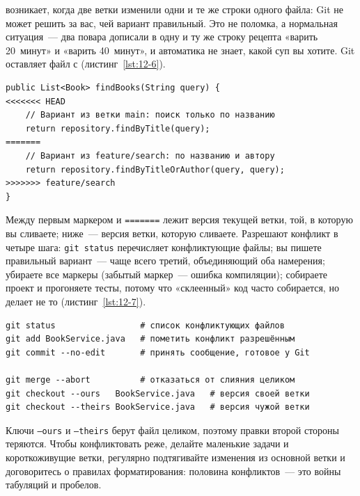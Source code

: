  возникает, когда две ветки изменили одни и те же строки одного файла: Git не может решить за вас, чей вариант правильный. Это не поломка, а нормальная ситуация~--- два повара дописали в одну и ту же строку рецепта «варить 20~минут» и «варить 40~минут», и автоматика не знает, какой суп вы хотите. Git оставляет файл с  (листинг~\ref{lst:12-6}).

\begin{listing}[H]
\begin{verbatim}
public List<Book> findBooks(String query) {
<<<<<<< HEAD
    // Вариант из ветки main: поиск только по названию
    return repository.findByTitle(query);
=======
    // Вариант из feature/search: по названию и автору
    return repository.findByTitleOrAuthor(query, query);
>>>>>>> feature/search
}
\end{verbatim}
\caption{Маркеры конфликта в файле}
\label{lst:12-6}
\end{listing}

Между первым маркером и \texttt{=======} лежит версия текущей ветки, той, в которую вы сливаете; ниже~--- версия ветки, которую сливаете. Разрешают конфликт в четыре шага: \texttt{git status} перечисляет конфликтующие файлы; вы пишете правильный вариант~--- чаще всего третий, объединяющий оба намерения; убираете все маркеры (забытый маркер~--- ошибка компиляции); собираете проект и прогоняете тесты, потому что «склеенный» код часто собирается, но делает не то (листинг~\ref{lst:12-7}).

\begin{listing}[H]
\begin{verbatim}
git status                 # список конфликтующих файлов
git add BookService.java   # пометить конфликт разрешённым
git commit --no-edit       # принять сообщение, готовое у Git

git merge --abort          # отказаться от слияния целиком
git checkout --ours   BookService.java   # версия своей ветки
git checkout --theirs BookService.java   # версия чужой ветки
\end{verbatim}
\caption{Команды при разрешении конфликта}
\label{lst:12-7}
\end{listing}

Ключи \texttt{--ours} и \texttt{--theirs} берут файл целиком, поэтому правки второй стороны теряются. Чтобы конфликтовать реже, делайте маленькие задачи и короткоживущие ветки, регулярно подтягивайте изменения из основной ветки и договоритесь о правилах форматирования: половина конфликтов~--- это войны табуляций и пробелов.


